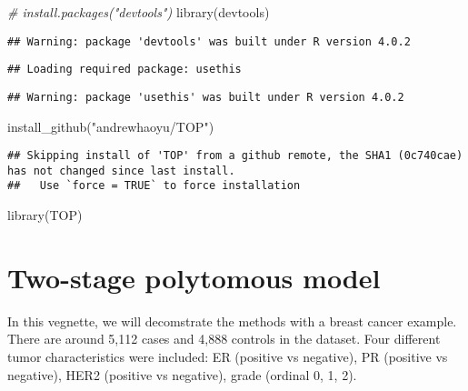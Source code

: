 \documentclass[11pt,]{article}
\newenvironment{Shaded}{\begin{snugshade}}{\end{snugshade}}
\newcommand{\CommentTok}[1]{\textcolor[rgb]{0.56,0.35,0.01}{\textit{#1}}}
\newcommand{\FunctionTok}[1]{\textcolor[rgb]{0.00,0.00,0.00}{#1}}
\newcommand{\NormalTok}[1]{#1}
\newcommand{\StringTok}[1]{\textcolor[rgb]{0.31,0.60,0.02}{#1}}
\begin{document}
\begin{Shaded}
\begin{Highlighting}[]
\CommentTok{\# install.packages("devtools")}
\FunctionTok{library}\NormalTok{(devtools)  }
\end{Highlighting}
\end{Shaded}

\begin{verbatim}
## Warning: package 'devtools' was built under R version 4.0.2
\end{verbatim}

\begin{verbatim}
## Loading required package: usethis
\end{verbatim}

\begin{verbatim}
## Warning: package 'usethis' was built under R version 4.0.2
\end{verbatim}

\begin{Shaded}
\begin{Highlighting}[]
\FunctionTok{install\_github}\NormalTok{(}\StringTok{"andrewhaoyu/TOP"}\NormalTok{)}
\end{Highlighting}
\end{Shaded}

\begin{verbatim}
## Skipping install of 'TOP' from a github remote, the SHA1 (0c740cae) has not changed since last install.
##   Use `force = TRUE` to force installation
\end{verbatim}

\begin{Shaded}
\begin{Highlighting}[]
\FunctionTok{library}\NormalTok{(TOP)}
\end{Highlighting}
\end{Shaded}

\hypertarget{two-stage-polytomous-model}{%
\section{Two-stage polytomous model}\label{two-stage-polytomous-model}}

In this vegnette, we will decomstrate the methods with a breast cancer
example. There are around 5,112 cases and 4,888 controls in the dataset.
Four different tumor characteristics were included: ER (positive vs
negative), PR (positive vs negative), HER2 (positive vs negative), grade
(ordinal 0, 1, 2).
\end{document}
